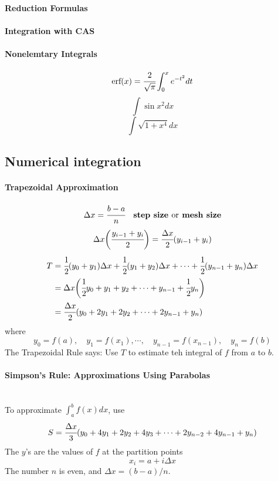 \documentclass{article}
\begin{document}
            \paragraph{Reduction Formulas}
            \paragraph{Integration with CAS}
            \paragraph{Nonelemtary Integrals}
            \[\text{erf}(x)=\cfrac{2}{\sqrt{\pi}}\int_0^x e^{-t^2}dt\]
            \[\int \sin x^2dx\]
            \[\int \sqrt{1+x^4}dx\]
        \subsection{Numerical integration}
            \paragraph{Trapezoidal Approximation}
            \[\Delta x=\cfrac{b-a}{n}\quad \textbf{step size } \text{or} \textbf{ mesh size}\]
            \[\Delta x\bigg(\cfrac{y_{i-1}+y_i}{2}\bigg)=\cfrac{\Delta x}{2}(y_{i-1}+y_i)\]
            \begin{equation}
                \begin{aligned}
                    T&=\cfrac{1}{2}(y_0+y_1)\Delta x+\cfrac{1}{2}(y_1+y_2)\Delta x+\cdots+\cfrac{1}{2}(y_{n-1}+y_n)\Delta x\\
                    &=\Delta x\bigg(\cfrac{1}{2}y_0+y_1+y_2+\cdots +y_{n-1}+\cfrac{1}{2}y_n\bigg)\\
                    &=\cfrac{\Delta x}{2}(y_0+2y_1+2y_2+\cdots+2y_{n-1}+y_n)
                \end{aligned}
            \end{equation}
            where
            \[y_0=f(a),\quad y_1=f(x_1), \cdots,\quad y_{n-1}=f(x_{n-1}),\quad y_n=f(b)\]
            The Trapezoidal Rule says: Use $T$ to estimate teh integral of $f$ from $a$ to $b$.
            \paragraph{Simpson's Rule: Approximations Using Parabolas}\text{}\\
                To approximate $\int_a^bf(x)dx$, use
                \[S=\cfrac{\Delta x}{3}(y_0+4y_1+2y_2+4y_3+\cdots+2y_{n-2}+4y_{n-1}+y_n)\]
                The $y$'s are the values of $f$ at the partition points
                \[x_i=a+i\Delta x\]
                The number $n$ is even, and $\Delta x=(b-a)/n$.
\end{document}
